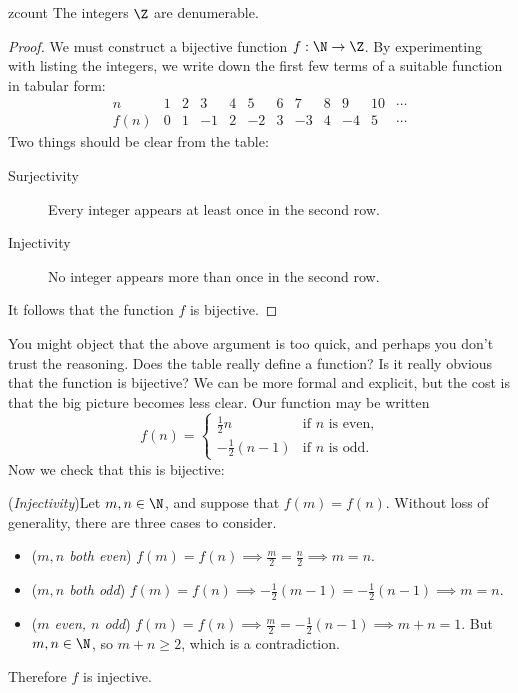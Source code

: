 \begin{thm}{}{zcount}
	The integers $\Z$ are denumerable.
\end{thm}

\begin{proof}
	We must construct a bijective function $f:\N\to\Z$. By experimenting with listing the integers, we write down the first few terms of a suitable function in tabular form:
	\[
		\begin{array}{c|ccccccccccc}
			n&1&2&3&4&5&6&7&8&9&10&\cdots\\\hline
			f(n)&0&1&-1&2&-2&3&-3&4&-4&5&\cdots
		\end{array}
	\]
	Two things should be clear from the table:
	\begin{description}
		\item[Surjectivity]\quad Every integer appears at least once in the second row.
		\item[Injectivity]\quad No integer appears more than once in the second row.
	\end{description}
	It follows that the function $f$ is bijective.
\end{proof}

You might object that the above argument is too quick, and perhaps you don't trust the reasoning. Does the table really define a function? Is it really obvious that the function is bijective? We can be more formal and explicit, but the cost is that the big picture becomes less clear. Our function may be written
\[
	f(n)=
	\begin{cases}
		\frac 12n&\text{if $n$ is even,}\\
		-\frac 12(n-1)&\text{if $n$ is odd.}
	\end{cases}
\]
Now we check that this is bijective:\par

(\emph{Injectivity})\quad Let $m,n\in\N$, and suppose that $f(m)=f(n)$. Without loss of generality, there are three cases to consider.
\begin{itemize}
	\item (\emph{$m,n$ both even}) $f(m)=f(n)\implies \frac m2=\frac n2\implies m=n$.
	\item (\emph{$m,n$ both odd}) $f(m)=f(n)\implies-\frac 12(m-1)=-\frac 12(n-1)\implies m=n$.
	\item (\emph{$m$ even, $n$ odd}) $f(m)=f(n)\implies\frac m2=-\frac 12(n-1)\implies m+n=1$. But $m,n\in\N$, so $m+n\ge 2$, which is a contradiction.
\end{itemize}
Therefore $f$ is injective.\par

